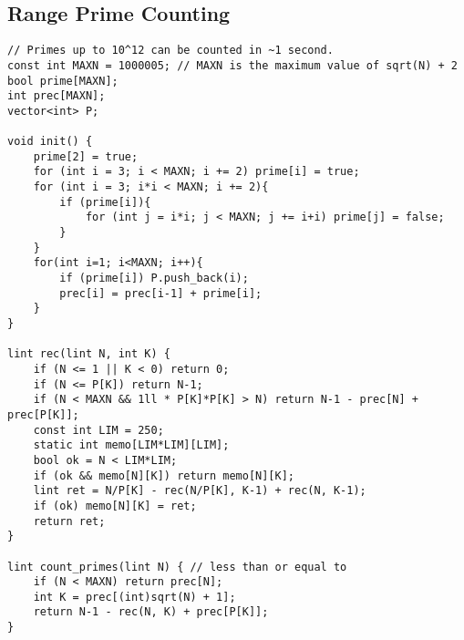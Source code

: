 \documentclass[landscape, 8pt, a4paper, oneside, twocolumn]{extarticle}
\begin{document}
\subsection{Range Prime Counting}
\begin{verbatim}
// Primes up to 10^12 can be counted in ~1 second.
const int MAXN = 1000005; // MAXN is the maximum value of sqrt(N) + 2
bool prime[MAXN];
int prec[MAXN];
vector<int> P;

void init() {
	prime[2] = true;
	for (int i = 3; i < MAXN; i += 2) prime[i] = true;
	for (int i = 3; i*i < MAXN; i += 2){
		if (prime[i]){
			for (int j = i*i; j < MAXN; j += i+i) prime[j] = false;
		}
	}
	for(int i=1; i<MAXN; i++){
		if (prime[i]) P.push_back(i);
		prec[i] = prec[i-1] + prime[i];
	}
}

lint rec(lint N, int K) {
	if (N <= 1 || K < 0) return 0;
	if (N <= P[K]) return N-1;
	if (N < MAXN && 1ll * P[K]*P[K] > N) return N-1 - prec[N] + prec[P[K]];
	const int LIM = 250;
	static int memo[LIM*LIM][LIM];
	bool ok = N < LIM*LIM;
	if (ok && memo[N][K]) return memo[N][K];
	lint ret = N/P[K] - rec(N/P[K], K-1) + rec(N, K-1);
	if (ok) memo[N][K] = ret;
	return ret;
}

lint count_primes(lint N) { // less than or equal to
	if (N < MAXN) return prec[N];
	int K = prec[(int)sqrt(N) + 1];
	return N-1 - rec(N, K) + prec[P[K]];
}
\end{verbatim}
\end{document}
